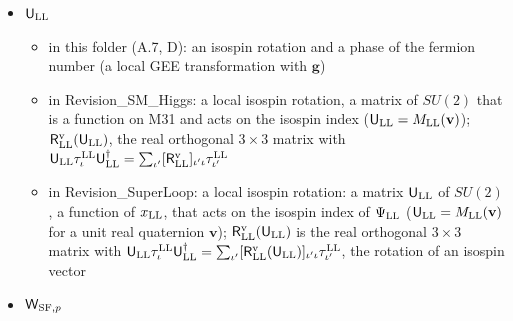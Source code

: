 \documentclass[
  10pt,
]{article}
\providecommand{\tightlist}{%
  \setlength{\itemsep}{0pt}\setlength{\parskip}{0pt}}
\begin{document}
\begin{itemize}
  \begin{itemize}
  \tightlist
  \item
    in this folder (D): the spinor matrix of a unit bi-quaternion (9.3)
  \item
    in Revision\_SM\_Higgs: the spinor matrix of a unit bi-quaternion,
    \(\mathrm{diag}(M_{\rm LL}(\tilde{\mathbf g}),M_{\rm LL}(\mathbf g))\)
    (blocks of \(2\times2\))
  \item
    in Revision\_SuperLoop: the spinor matrix of the Lorentz
    transformation \(\mathbf g\): the \(4\times4\) matrix
    \(\mathsf S_{\rm LL}(\mathbf g)=\mathrm{diag}(M_{\rm LL}(\tilde{\mathbf g}),M_{\rm LL}(\mathbf g))\)
    of \(2\times2\) blocks (on the eight components of
    \(\Psi_{\rm LL}\):
    \(\mathsf S_{\rm LL}(\mathbf g)\otimes\sigma^{\rm LL}_0\), plain
    text \texttt{Sspin});
    \(\mathsf S_{\rm LL}(\mathbf g)^{-1}\gamma^p_{\rm LL}\mathsf S_{\rm LL}(\mathbf g)=\sum_{p'}[\mathsf L_{\rm LL}(\mathbf g)]_{pp'}\gamma^{p'}_{\rm LL}\),
    where \([\mathsf L_{\rm LL}(\mathbf g)]_{pp'}\) is the entry in row
    \(p\) and column \(p'\)
  \end{itemize}
\item
  \(\mathsf U_{\rm LL}\)

  \begin{itemize}
  \tightlist
  \item
    in this folder (A.7, D): an isospin rotation and a phase of the
    fermion number (a local GEE transformation with \(\mathbf g\))
  \item
    in Revision\_SM\_Higgs: a local isospin rotation, a matrix of
    \(SU(2)\) that is a function on M31 and acts on the isospin index
    (\(\mathsf U_{\rm LL}=M_{\rm LL}(\mathbf v)\));
    \(\mathsf R^{\rm v}_{\rm LL}(\mathsf U_{\rm LL})\), the real
    orthogonal \(3\times3\) matrix with
    \(\mathsf U_{\rm LL}\tau^{\rm LL}_\iota\mathsf U_{\rm LL}^\dagger=\sum_{\iota'}[\mathsf R^{\rm v}_{\rm LL}]_{\iota'\iota}\tau^{\rm LL}_{\iota'}\)
  \item
    in Revision\_SuperLoop: a local isospin rotation: a matrix
    \(\mathsf U_{\rm LL}\) of \(SU(2)\), a function of \(x_{\rm LL}\),
    that acts on the isospin index of \(\Psi_{\rm LL}\)
    (\(\mathsf U_{\rm LL}=M_{\rm LL}(\mathbf v)\) for a unit real
    quaternion \(\mathbf v\));
    \(\mathsf R^{\rm v}_{\rm LL}(\mathsf U_{\rm LL})\) is the real
    orthogonal \(3\times3\) matrix with
    \(\mathsf U_{\rm LL}\tau^{\rm LL}_\iota\mathsf U_{\rm LL}^\dagger=\sum_{\iota'}[\mathsf R^{\rm v}_{\rm LL}(\mathsf U_{\rm LL})]_{\iota'\iota}\tau^{\rm LL}_{\iota'}\),
    the rotation of an isospin vector
  \end{itemize}
\item
  \(\mathsf W_{{\rm SF},p}\)


\end{itemize}
\end{document}

